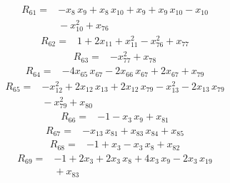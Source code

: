 \documentclass[11pt]{article}
\begin{document}
\begin{equation*}\begin{aligned}
R_{61}={}&-x_{8}\,x_{9} + x_{8}\,x_{10} + x_{9} + x_{9}\,x_{10} - x_{10} \\
&{} - x_{10}^{2} + x_{76}
\end{aligned}\end{equation*}
\begin{equation*}\begin{aligned}
R_{62}={}&1 + 2x_{11} + x_{11}^{2} - x_{76}^{2} + x_{77}
\end{aligned}\end{equation*}
\begin{equation*}\begin{aligned}
R_{63}={}&-x_{77}^{2} + x_{78}
\end{aligned}\end{equation*}
\begin{equation*}\begin{aligned}
R_{64}={}&-4x_{65}\,x_{67} - 2x_{66}\,x_{67} + 2x_{67} + x_{79}
\end{aligned}\end{equation*}
\begin{equation*}\begin{aligned}
R_{65}={}&-x_{12}^{2} + 2x_{12}\,x_{13} + 2x_{12}\,x_{79} - x_{13}^{2} - 2x_{13}\,x_{79} \\
&{} - x_{79}^{2} + x_{80}
\end{aligned}\end{equation*}
\begin{equation*}\begin{aligned}
R_{66}={}&-1 - x_{3}\,x_{9} + x_{81}
\end{aligned}\end{equation*}
\begin{equation*}\begin{aligned}
R_{67}={}&-x_{13}\,x_{81} + x_{83}\,x_{84} + x_{85}
\end{aligned}\end{equation*}
\begin{equation*}\begin{aligned}
R_{68}={}&-1 + x_{3} - x_{3}\,x_{8} + x_{82}
\end{aligned}\end{equation*}
\begin{equation*}\begin{aligned}
R_{69}={}&-1 + 2x_{3} + 2x_{3}\,x_{8} + 4x_{3}\,x_{9} - 2x_{3}\,x_{19} \\
&{} + x_{83}
\end{aligned}\end{equation*}
\end{document}
